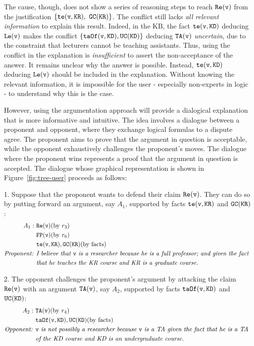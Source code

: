 \begin{example}
The cause, though, does not show a series of reasoning steps to reach $\texttt{\textup{Re}}(\texttt{\textup{v}})$ from the justification $\{\texttt{\textup{te}}(\texttt{\textup{v}},\texttt{\textup{KR}}),\ \texttt{\textup{GC}}(\texttt{\textup{KR}})\}$.
The conflict still lacks \emph{all relevant information} to explain this result.
Indeed, in the KB, the fact $\texttt{\textup{te}}(\texttt{\textup{v}}, \texttt{\textup{KD}})$ deducing $\texttt{\textup{Le}}(\texttt{\textup{v}})$ makes the conflict $\{\texttt{\textup{taOf}}(\texttt{\textup{v}},\texttt{\textup{KD}}), \texttt{\textup{UC}}(\texttt{\textup{KD}}) \}$ deducing $\texttt{\textup{TA}}(\texttt{\textup{v}})$ \emph{uncertain}, due to the constraint that lecturers cannot be teaching assistants. Thus, using the conflict in the explanation is \emph{insufficient} to assert the non-acceptance of the answer. 
It remains unclear why the answer is possible.
Instead, $\texttt{\textup{te}}(\texttt{\textup{v}}, \texttt{\textup{KD}})$ deducing $\texttt{\textup{Le}}(\texttt{\textup{v}})$ should be included in the explanation.
Without knowing the relevant information, it is impossible for the user - especially non-experts in logic - to understand why this is the case.

However, using the argumentation approach will provide a dialogical explanation that is more informative and intuitive.
The idea involves a dialogue between a proponent and opponent, where they exchange logical formulas to a dispute agree.
The proponent aims to prove that the argument in question is acceptable, while the opponent exhaustively challenges the proponent’s moves. The dialogue where the proponent wins represents a proof that the argument in question is accepted. The dialogue whose graphical representation is shown in Figure~\ref{fig:tree-user} proceeds as follows:

1. Suppose that the proponent wants to defend their claim $\texttt{\textup{Re}}(\texttt{\textup{v}})$. They can do so by putting forward an argument, say $A_1$, supported by facts $\texttt{\textup{te}}(\texttt{\textup{v}}, \texttt{\textup{KR}})$ and $\texttt{\textup{GC}}(\texttt{\textup{KR}})$: 
\begin{align*}
     A_1 :\ & \texttt{\textup{Re}}(\texttt{\textup{v}}) (\text{by } r_3) \\
          & \texttt{\textup{FP}}(\texttt{\textup{v}}) (\text{by } r_6) \\
          & \texttt{\textup{te}}(\texttt{\textup{v}}, \texttt{\textup{KR}}), \texttt{\textup{GC}}(\texttt{\textup{KR}}) (\text{by facts})\\
    \emph{Proponent: }  & \emph{I believe that } \texttt{\textup{v}} \emph{ is a researcher because he is a full professor; and given the fact }\\
    & \emph{that he teaches the KR course and KR is a graduate course.}
\end{align*}

2. The opponent challenges the proponent’s argument by attacking the claim $\texttt{\textup{Re}}(\texttt{\textup{v}})$ with an argument $\texttt{\textup{TA}}(\texttt{\textup{v}})$, say $A_2$, supported by facts $\texttt{\textup{taOf}}(\texttt{\textup{v}}, \texttt{\textup{KD}})$ and $\texttt{\textup{UC}}(\texttt{\textup{KD}})$:
%
\begin{align*}
    A_2:\ & \texttt{\textup{TA}}(\texttt{\textup{v}}) (\text{by } r_4) \\
         & \texttt{\textup{taOf}}(\texttt{\textup{v}}, \texttt{\textup{KD}}), \texttt{\textup{UC}}(\texttt{\textup{KD}}) (\text{by facts})\\
  \emph{Opponent: }    &  \texttt{\textup{v}} \emph{ is not possibly a researcher because } \texttt{\textup{v}} \emph{ is a TA given the fact that he is a TA }\\
    & \emph{of the KD course and  KD is an undergraduate course.}
\end{align*}


\end{example}

